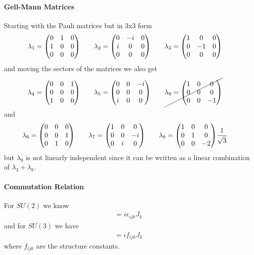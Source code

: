 \documentclass[../main.tex]{subfiles}
\begin{document}
\paragraph*{Gell-Mann Matrices}  Starting with the Pauli matrices but in 3x3 form
\begin{align*}
    \lambda_1 &= \mqty(0 & 1 & 0 \\ 1 & 0 & 0 \\ 0 & 0 & 0) \qquad
    \lambda_2 = \mqty(0 & -i & 0 \\ i & 0 & 0 \\ 0 & 0 & 0) \qquad
    \lambda_3 = \mqty(1 & 0 & 0 \\ 0 & -1 & 0 \\ 0 & 0 & 0)
\end{align*}
and moving the sectors of the matrices we also get
\begin{align*}
    \lambda_4 &= \mqty(0 & 0 & 1 \\ 0 & 0 & 0 \\ 1 & 0 & 0) \qquad
    \lambda_5 = \mqty(0 & 0 & -i \\ 0 & 0 & 0 \\ i & 0 & 0) \qquad
    \cancel{\lambda_9 = \mqty(1 & 0 & 0 \\ 0 & 0 & 0 \\ 0 & 0 & -1)}
\end{align*}
and
\begin{align*}
    \lambda_6 &= \mqty(0 & 0 & 0 \\ 0 & 0 & 1 \\ 0 & 1 & 0) \qquad
    \lambda_7 =  \mqty(1 & 0 & 0 \\ 0 & 0 & -i \\ 0 & i & 0) \qquad
    \lambda_8 =  \mqty(1 & 0 & 0 \\ 0 & 1 & 0 \\ 0 & 0 & -2) \frac{1}{\sqrt{3}}
\end{align*}
but $\lambda_9$ is not linearly independent since it can be written as a linear combination of
$\lambda_3 + \lambda_8$. 
\paragraph*{Commutation Relation} For $SU(2)$ we know
\begin{align*}
    [J_i, J_j] = i \epsilon_{ijk} J_k
\end{align*}
and for $SU(3)$ we have
\begin{align*}
    [J_i, J_j] = i f_{ijk} J_k
\end{align*}
where $f_{ijk}$ are the structure constants.
\end{document}
